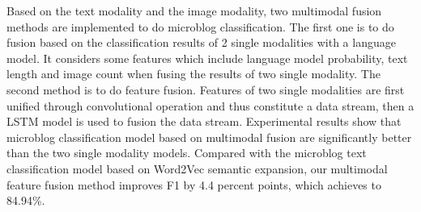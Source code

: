 \begin{eabstract}
Based on the text modality and the image modality,
two multimodal fusion methods are implemented to do microblog classification.
The first one is to do fusion based on the classification results of 2 single modalities with a language model.
It considers some features which include language model probability, text length and image count when fusing  the  results of two single modality.
The second method is to do feature fusion. Features of two single modalities are first unified through convolutional operation
and thus constitute a data stream, then a LSTM model is used to fusion the data stream.
Experimental results show that microblog classification model based on multimodal fusion are significantly better than the two single modality models.
Compared with the microblog text classification model based on Word2Vec semantic expansion, our multimodal feature fusion method improves F1 by 4.4 percent points, which achieves to 84.94\%.

\end{eabstract}

